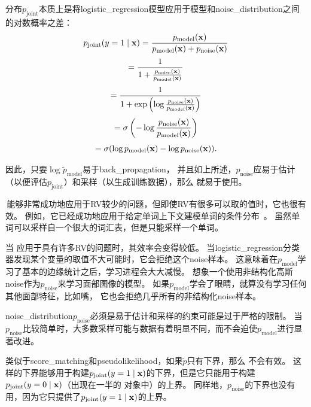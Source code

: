 分布$p_{\text{joint}}$本质上是将\gls{logistic_regression}模型应用于模型和\gls{noise_distribution}之间的对数概率之差：
\begin{equation}
	p_{\text{joint}} (y = 1 \mid \mathbf{x}) = \frac{ p_{\text{model}}(\mathbf{x}) }{ p_{\text{model}}(\mathbf{x}) + p_{\text{noise}}(\mathbf{x}) }
\end{equation}
\begin{equation}
 = \frac{1}{1 + \frac{ p_{\text{noise}}(\mathbf{x}) }{ p_{\text{model}}(\mathbf{x}) }}
\end{equation}
\begin{equation}
= \frac{1}{1 + \exp \left( \log \frac{ p_{\text{noise}}(\mathbf{x}) }{ p_{\text{model}}(\mathbf{x}) } \right)}
\end{equation}
\begin{equation}
	= \sigma \left( - \log \frac{ p_{\text{noise}} (\mathbf{x}) }{ p_{\text{model}} (\mathbf{x}) } \right)
\end{equation}
\begin{equation}
	= \sigma ( \log p_{\text{model}} (\mathbf{x}) - \log p_{\text{noise}} (\mathbf{x})  ) .
\end{equation}


因此，只要$\log \tilde{p}_{\text{model}}$易于\gls{back_propagation}，
并且如上所述，$p_{\text{noise}}$应易于估计（以便评估$p_{\text{joint}}$）和采样（以生成训练数据），那么\,\,就易于使用。


\,能够非常成功地应用于\gls{RV}较少的问题，但即使\gls{RV}有很多可以取的值时，它也很有效。
例如，它已经成功地应用于给定单词上下文建模单词的条件分布~\citep{Mnih2013}。
虽然单词可以采样自一个很大的词汇表，但是只能采样一个单词。


当\,\,应用于具有许多\gls{RV}的问题时，其效率会变得较低。
当\gls{logistic_regression}分类器发现某个变量的取值不大可能时，它会拒绝这个\gls{noise}样本。
这意味着在$p_{\text{model}}$学习了基本的边缘统计之后，学习进程会大大减慢。
想象一个使用非结构化高斯\gls{noise}作为$p_{\text{noise}}$来学习面部图像的模型。
如果$p_{\text{model}}$学会了眼睛，就算没有学习任何其他面部特征，比如嘴， 它也会拒绝几乎所有的非结构化\gls{noise}样本。

\gls{noise_distribution}$p_{\text{noise}}$必须是易于估计和采样的约束可能是过于严格的限制。
当$p_{\text{noise}}$比较简单时，大多数采样可能与数据有着明显不同，而不会迫使$p_{\text{model}}$进行显著改进。


类似于\gls{score_matching}和\gls{pseudolikelihood}，如果$\tilde{p}$只有下界，那么\,\,不会有效。
这样的下界能够用于构建$p_{\text{joint}}( y = 1 \mid \mathbf{x})$的下界，但是它只能用于构建$p_{\text{joint}}(y = 0 \mid \mathbf{x})$（出现在一半的\,\,对象中）的上界。
同样地，$p_{\text{noise}}$的下界也没有用，因为它只提供了$p_{\text{joint}}( y = 1 \mid \mathbf{x})$的上界。


